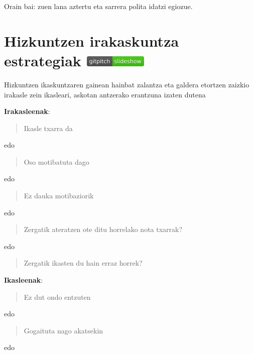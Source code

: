 \documentclass[]{book}
\begin{document}
Orain bai: zuen lana aztertu eta sarrera polita idatzi egiozue.

\hypertarget{hizkuntzen-irakaskuntza-estrategiak-gitpitch}{%
\chapter[Hizkuntzen irakaskuntza estrategiak ]{\texorpdfstring{Hizkuntzen irakaskuntza estrategiak \href{https://gitpitch.com/JuanAbasolo/HD/04-gaia?grs=github\&t=simple}{\protect\includegraphics{assets/badge.png}}}{Hizkuntzen irakaskuntza estrategiak GitPitch}}\label{hizkuntzen-irakaskuntza-estrategiak-gitpitch}}

Hizkuntzen ikaskuntzaren gainean hainbat zalantza eta galdera etortzen zaizkio irakasle zein ikasleari, askotan antzerako erantzuna izaten dutena

\textbf{Irakasleenak}:

\begin{quote}
Ikasle txarra da
\end{quote}

edo

\begin{quote}
Oso motibatuta dago
\end{quote}

edo

\begin{quote}
Ez dauka motibaziorik
\end{quote}

edo

\begin{quote}
Zergatik ateratzen ote ditu horrelako nota txarrak?
\end{quote}

edo

\begin{quote}
Zergatik ikasten du hain erraz horrek?
\end{quote}

\textbf{Ikasleenak}:

\begin{quote}
Ez dut ondo entzuten
\end{quote}

edo

\begin{quote}
Gogaituta nago akatsekin
\end{quote}

edo
\end{document}

